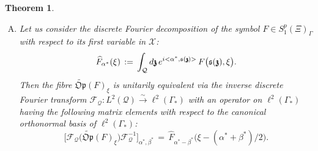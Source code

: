 \documentclass[12pt]{article}
\newtheorem{theorem}{Theorem}[section]
\theoremstyle{definition}
\def\Op{\mathfrak{Op}}
\def\X{\mathcal X}
\def\T{\mathcal{Q}}
\def\s{\mathfrak{s}}
\def\bz{\mathfrak{z}\hspace*{-4pt}\mathfrak{z}}
\def\beq{\begin{equation}}
\def\eeq{\end{equation}}
\numberwithin{equation}{section}
\begin{document}
\begin{theorem}
\begin{enumerate}[A. ]
\item {Let us consider the discrete Fourier decomposition of the symbol $F\in{S}^p_1(\Xi)_{\Gamma}$ with respect to its first variable in $\X$:
\beq\label{F-61}
\widehat{F}_{\alpha^*}(\xi)\,:=\,\int_{\T}d\bz\,e^{i<\alpha^*,\s(\bz)>}\,F\big(\s(\bz),\xi\big).
\eeq Then the fibre $\widetilde{\Op}(F)_{\xi}$} is unitarily equivalent via the inverse discrete Fourier transform $\mathcal{F}_{\T}:L^2(\T)\overset{\sim}{\longrightarrow}\ell^2(\Gamma_*)$ with an operator on $\ell^2(\Gamma_*)$ having the following matrix elements with respect to the canonical orthonormal basis of $\ell^2(\Gamma_*)$:
\beq\label{F-52}
\big[\mathcal{F}_{\T}\big(\widetilde{\Op}(F)_{\xi}\big)\mathcal{F}_{\T}^{-1}\big]_{\alpha^*,\beta^*}\,=\,{\widehat{F}_{\alpha^*-\beta^*}\big(\xi -(\alpha^*+\beta^*)/2\big)}.
\eeq	
\end{enumerate}
\end{theorem}
\end{document}
